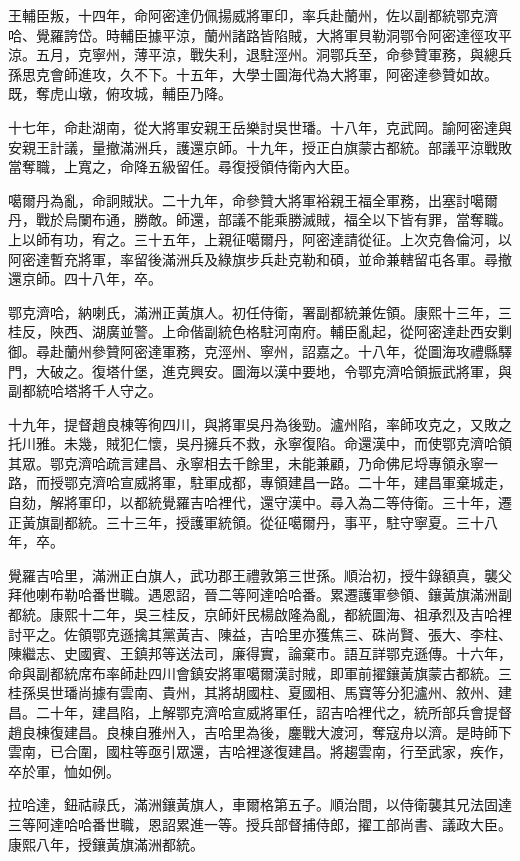 \begin{pinyinscope}
王輔臣叛，十四年，命阿密達仍佩揚威將軍印，率兵赴蘭州，佐以副都統鄂克濟哈、覺羅誇岱。時輔臣據平涼，蘭州諸路皆陷賊，大將軍貝勒洞鄂令阿密達徑攻平涼。五月，克寧州，薄平涼，戰失利，退駐涇州。洞鄂兵至，命參贊軍務，與總兵孫思克會師進攻，久不下。十五年，大學士圖海代為大將軍，阿密達參贊如故。既，奪虎山墩，俯攻城，輔臣乃降。

十七年，命赴湖南，從大將軍安親王岳樂討吳世璠。十八年，克武岡。諭阿密達與安親王計議，量撤滿洲兵，護還京師。十九年，授正白旗蒙古都統。部議平涼戰敗當奪職，上寬之，命降五級留任。尋復授領侍衛內大臣。

噶爾丹為亂，命詗賊狀。二十九年，命參贊大將軍裕親王福全軍務，出塞討噶爾丹，戰於烏闌布通，勝敵。師還，部議不能乘勝滅賊，福全以下皆有罪，當奪職。上以師有功，宥之。三十五年，上親征噶爾丹，阿密達請從征。上次克魯倫河，以阿密達暫充將軍，率留後滿洲兵及綠旗步兵赴克勒和碩，並命兼轄留屯各軍。尋撤還京師。四十八年，卒。

鄂克濟哈，納喇氏，滿洲正黃旗人。初任侍衛，署副都統兼佐領。康熙十三年，三桂反，陜西、湖廣並警。上命偕副統色格駐河南府。輔臣亂起，從阿密達赴西安剿御。尋赴蘭州參贊阿密達軍務，克涇州、寧州，詔嘉之。十八年，從圖海攻禮縣驛門，大破之。復塔什堡，進克興安。圖海以漢中要地，令鄂克濟哈領振武將軍，與副都統哈塔將千人守之。

十九年，提督趙良棟等徇四川，與將軍吳丹為後勁。瀘州陷，率師攻克之，又敗之托川雅。未幾，賊犯仁懷，吳丹擁兵不救，永寧復陷。命還漢中，而使鄂克濟哈領其眾。鄂克濟哈疏言建昌、永寧相去千餘里，未能兼顧，乃命佛尼埒專領永寧一路，而授鄂克濟哈宣威將軍，駐軍成都，專領建昌一路。二十年，建昌軍棄城走，自劾，解將軍印，以都統覺羅吉哈裡代，還守漢中。尋入為二等侍衛。三十年，遷正黃旗副都統。三十三年，授護軍統領。從征噶爾丹，事平，駐守寧夏。三十八年，卒。

覺羅吉哈里，滿洲正白旗人，武功郡王禮敦第三世孫。順治初，授牛錄額真，襲父拜他喇布勒哈番世職。遇恩詔，晉二等阿達哈哈番。累遷護軍參領、鑲黃旗滿洲副都統。康熙十二年，吳三桂反，京師奸民楊啟隆為亂，都統圖海、祖承烈及吉哈裡討平之。佐領鄂克遜擒其黨黃吉、陳益，吉哈里亦獲焦三、硃尚賢、張大、李柱、陳繼志、史國賓、王鎮邦等送法司，廉得實，論棄市。語互詳鄂克遜傳。十六年，命與副都統席布率師赴四川會鎮安將軍噶爾漢討賊，即軍前擢鑲黃旗蒙古都統。三桂孫吳世璠尚據有雲南、貴州，其將胡國柱、夏國相、馬寶等分犯瀘州、敘州、建昌。二十年，建昌陷，上解鄂克濟哈宣威將軍任，詔吉哈裡代之，統所部兵會提督趙良棟復建昌。良棟自雅州入，吉哈里為後，鏖戰大渡河，奪寇舟以濟。是時師下雲南，已合圍，國柱等亟引眾還，吉哈裡遂復建昌。將趨雲南，行至武家，疾作，卒於軍，恤如例。

拉哈達，鈕祜祿氏，滿洲鑲黃旗人，車爾格第五子。順治間，以侍衛襲其兄法固達三等阿達哈哈番世職，恩詔累進一等。授兵部督捕侍郎，擢工部尚書、議政大臣。康熙八年，授鑲黃旗滿洲都統。


\end{pinyinscope}

